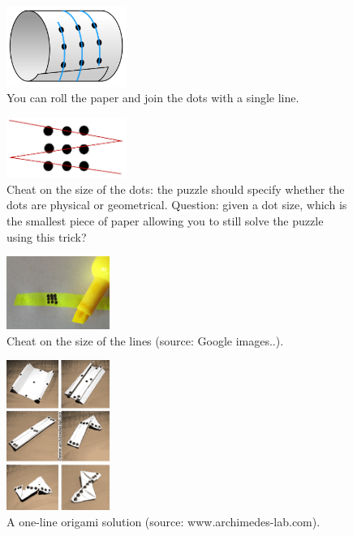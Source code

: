 \documentclass[11pt]{article}
\begin{document}
\begin{figure}
\includegraphics[width=0.35\textwidth]{images/nine-dots-roll-paper.png}
\caption{You can roll the paper and join the dots with a single line\cite{wikipedia-out-of-the-box}.}
\label{nine-dots-roll-paper}
\end{figure}

\begin{figure}
\includegraphics[width=0.35\textwidth]{images/nine-dots-finite-width.png}
\caption{Cheat on the size of the dots: the puzzle should specify whether the dots are physical or geometrical. Question: given a dot size, which is the smallest piece of paper allowing you to still solve the puzzle using this trick?}
\label{nine-dots-dots-width}
\end{figure}

\begin{figure}
\includegraphics[width=0.3\textwidth]{images/9-dots-line-width.png}
\caption{Cheat on the size of the lines (source: Google images..).}
\label{nine-dots-line-width}
\end{figure}

\begin{figure}
\includegraphics[width=0.3\textwidth]{images/9-dots-origami-solution.png}
\caption{A one-line origami solution (source: www.archimedes-lab.com).}
\label{nine-dots-origami-solution}
\end{figure}
\end{document}
